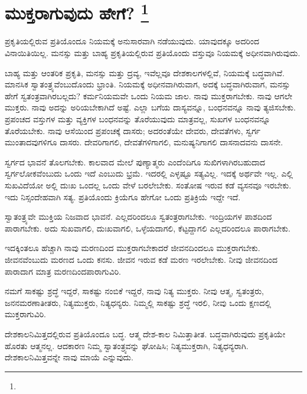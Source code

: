 
\vspace{-0.6cm}

\chapter[ಮುಕ್ತರಾಗುವುದು ಹೇಗೆ? ]{ಮುಕ್ತರಾಗುವುದು ಹೇಗೆ? \protect\footnote{}}

ಪ್ರಕೃತಿಯಲ್ಲಿರುವ ಪ್ರತಿಯೊಂದೂ ನಿಯಮಕ್ಕೆ ಅನುಸಾರವಾಗಿ ನಡೆಯುವುದು. ಯಾವುದಕ್ಕೂ ಅದರಿಂದ ವಿನಾಯಿತಿಯಿಲ್ಲ. ಮನಸ್ಸು ಮತ್ತು ಬಾಹ್ಯ ಪ್ರಕೃತಿಯಲ್ಲಿರುವ ಪ್ರತಿಯೊಂದು ವಸ್ತುವೂ ನಿಯಮಕ್ಕೆ ಅಧೀನವಾಗಿರುವುದು.

\eject

ಬಾಹ್ಯ ಮತ್ತು ಆಂತರಿಕ ಪ್ರಕೃತಿ, ಮನಸ್ಸು ಮತ್ತು ದ್ರವ್ಯ, ಇವೆಲ್ಲವೂ ದೇಶ\break ಕಾಲಗಳಲ್ಲಿವೆ, ನಿಯಮಕ್ಕೆ ಬದ್ಧವಾಗಿವೆ. ಮಾನಸಿಕ ಸ್ವಾತಂತ್ರ್ಯವೆಂಬುದೊಂದು ಭ್ರಾಂತಿ. ನಿಯಮಕ್ಕೆ ಅಧೀನವಾಗಿರುವಾಗ, ಅದಕ್ಕೆ ಬದ್ಧವಾಗಿರುವಾಗ, ಮನಸ್ಸು ಹೇಗೆ ಸ್ವತಂತ್ರವಾಗಿರಬಲ್ಲದು? ಕರ್ಮನಿಯಮವೇ ಒಂದು ನಿಯಮ ಜಾಲ. ನಾವು ಮುಕ್ತರಾಗಬೇಕು. ನಾವು ಆಗಲೇ ಮುಕ್ತರು. ನಾವು ಅದನ್ನು ಅರಿಯಬೇಕಾಗಿದೆ ಅಷ್ಟೆ. ಎಲ್ಲಾ ಬಗೆಯ ದಾಸ್ಯವನ್ನೂ, ಬಂಧನವನ್ನೂ ನಾವು ತ್ಯಜಿಸಬೇಕು. ಪ್ರಪಂಚದ ವಸ್ತುಗಳ ಮತ್ತು ವ್ಯಕ್ತಿಗಳ ಬಂಧನವನ್ನು ತೊರೆಯುವುದು ಮಾತ್ರವಲ್ಲ, ಸುಖಗಳ ಬಂಧನವನ್ನೂ ತೊರೆಯಬೇಕು. ನಾವು ಆಸೆಯಿಂದ ಪ್ರಪಂಚಕ್ಕೆ ದಾಸರು; ಅದರಂತೆಯೇ ದೇವರು, ದೇವತೆಗಳು, ಸ್ವರ್ಗ ಮುಂತಾದವುಗಳಿಗೂ ದಾಸರು. ದೇವರಿಗಾಗಲಿ, ದೇವತೆಗಳಿಗಾಗಲಿ, ಮನುಷ್ಯನಿಗಾಗಲಿ ದಾಸನಾದವನು ದಾಸನೇ.

\vskip 0.1cm

ಸ್ವರ್ಗದ ಭಾವನೆ ತೊಲಗಬೇಕು. ಕಾಲವಾದ ಮೇಲೆ ಪುಣ್ಯಾತ್ಮರು ಎಂದೆಂದಿಗೂ ಸುಖಿಗಳಾಗಿರಬಹುದಾದ ಸ್ವರ್ಗಲೋಕವೆಂಬುದು ಒಂದು ಇದೆ ಎಂಬುದು ಭ್ರಮೆ. ಇದರಲ್ಲಿ ಎಳ್ಳಷ್ಟೂ ಸತ್ಯವಿಲ್ಲ. ಇದಕ್ಕೆ ಅರ್ಥವೇ ಇಲ್ಲ. ಎಲ್ಲಿ ಸುಖವಿದೆಯೋ ಅಲ್ಲಿ ದುಃಖ ಒಂದಲ್ಲ ಒಂದು ವೇಳೆ ಬರಲೇಬೇಕು. ಸಂತೋಷ ಇರುವ ಕಡೆ ವ್ಯಸನವೂ ಇರಬೇಕು. ಇದು ನಿಸ್ಸಂದೇಹವಾಗಿ ಸತ್ಯ. ಪ್ರತಿಯೊಂದು ಕ್ರಿಯೆಗೂ ಹೇಗೋ ಒಂದು ಪ್ರತಿಕ್ರಿಯೆ ಇದ್ದೇ ಇದೆ.

\vskip 0.1cm

ಸ್ವಾತಂತ್ರ್ಯವೇ ಮುಕ್ತಿಯ ನಿಜವಾದ ಭಾವನೆ. ಎಲ್ಲದರಿಂದಲೂ ಸ್ವತಂತ್ರರಾಗಬೇಕು. ಇಂದ್ರಿಯಗಳ ಪಾಶದಿಂದ ಪಾರಾಗಬೇಕು. ಅದು ಸುಖವಾಗಲಿ, ದುಃಖವಾಗಲಿ, ಒಳ್ಳೆಯದಾಗಲಿ, ಕೆಟ್ಟದ್ದಾಗಲಿ ಎಲ್ಲದರಿಂದಲೂ ಪಾರಾಗಬೇಕು.

\vskip 0.1cm

ಇದಕ್ಕಿಂತಲೂ ಹೆಚ್ಚಾಗಿ ನಾವು ಮರಣದಿಂದ ಮುಕ್ತರಾಗಬೇಕಾದರೆ ಜೀವನದಿಂದಲೂ ಮುಕ್ತರಾಗಬೇಕು. ಜೀವನವೆಂಬುದು ಮರಣದ ಒಂದು ಕನಸು. ಜೀವನ ಇರುವ ಕಡೆ ಮರಣ ಇರಲೇಬೇಕು. ನೀವು ಜೀವನದಿಂದ ಪಾರಾದಾಗ ಮಾತ್ರ ಮರಣದಿಂದ\break ಪಾರಾಗುವಿರಿ.

\vskip 0.1cm

ನಮಗೆ ಸಾಕಷ್ಟು ಶ್ರದ್ಧೆ ಇದ್ದರೆ, ಸಾಕಷ್ಟು ನಂಬಿಕೆ ಇದ್ದರೆ, ನಾವು ನಿತ್ಯ ಮುಕ್ತರು. ನೀವು ಆತ್ಮ, ಸ್ವತಂತ್ರರು, ಜನನಮರಣಾತೀತರು, ನಿತ್ಯಮುಕ್ತರು, ನಿತ್ಯಧನ್ಯರು. ನಿಮ್ಮಲ್ಲಿ ಸಾಕಷ್ಟು ಶ್ರದ್ಧೆ ಇರಲಿ, ನೀವು ಒಂದು ಕ್ಷಣದಲ್ಲಿ ಮುಕ್ತರಾಗುವಿರಿ.

\vskip 0.1cm

ದೇಶಕಾಲನಿಮಿತ್ತದಲ್ಲಿರುವ ಪ್ರತಿಯೊಂದೂ ಬದ್ಧ. ಆತ್ಮ ದೇಶ-ಕಾಲ ನಿಮಿತ್ತಾತೀತ. ಬದ್ಧವಾಗಿರುವುದು ಪ್ರಕೃತಿಯೇ ಹೊರತು ಆತ್ಮನಲ್ಲ. ಆದಕಾರಣ ನಿಮ್ಮ ಸ್ವಾತಂತ್ರ್ಯವನ್ನು ಘೋಷಿಸಿ; ನಿತ್ಯಮುಕ್ತರಾಗಿ, ನಿತ್ಯಧನ್ಯರಾಗಿ. ದೇಶಕಾಲನಿಮಿತ್ತವನ್ನೇ ನಾವು ಮಾಯೆ ಎನ್ನುವುದು.

